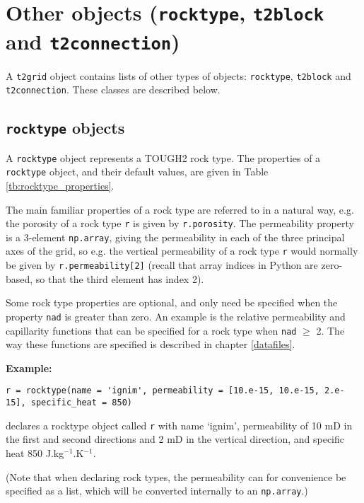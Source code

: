 \section{Other objects (\texttt{rocktype}, \texttt{t2block} and \texttt{t2connection})}

A \texttt{t2grid} object contains lists of other types of objects: \texttt{rocktype}, \texttt{t2block} and \texttt{t2connection}.  These classes are described below.

\subsection{\texttt{rocktype} objects}
\label{rocktypeobjects}

A \texttt{rocktype} object represents a TOUGH2 rock type.  The properties of a \texttt{rocktype} object, and their default values, are given in Table \ref{tb:rocktype_properties}.

The main familiar properties of a rock type are referred to in a natural way, e.g. the porosity of a rock type \texttt{r} is given by \texttt{r.porosity}.  The permeability property is a 3-element \texttt{np.array}, giving the permeability in each of the three principal axes of the grid, so e.g. the vertical permeability of a rock type \texttt{r} would normally be given by \texttt{r.permeability[2]} (recall that array indices in Python are zero-based, so that the third element has index 2).

Some rock type properties are optional, and only need be specified when the property \texttt{nad} is greater than zero.  An example is the relative permeability and capillarity functions that can be specified for a rock type when \texttt{nad} $\ge$ 2.  The way these functions are specified is described in chapter \ref{datafiles}.

\textbf{Example:}

\begin{lstlisting}
r = rocktype(name = 'ignim', permeability = [10.e-15, 10.e-15, 2.e-15], specific_heat = 850)
\end{lstlisting}

declares a rocktype object called \texttt{r} with name `ignim', permeability of 10 mD in the first and second directions and 2 mD in the vertical direction, and specific heat 850 J.kg$^{-1}$.K$^{-1}$.

(Note that when declaring rock types, the permeability can for convenience be specified as a list, which will be converted internally to an \texttt{np.array}.)

